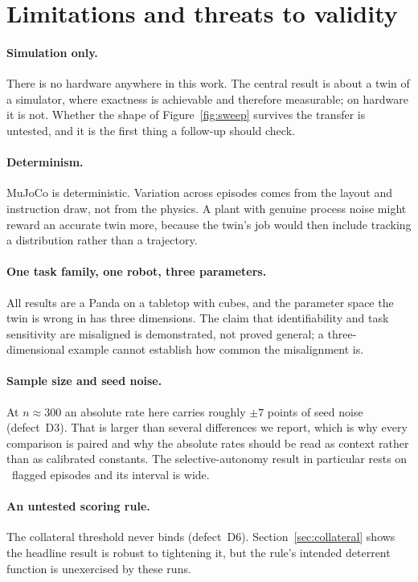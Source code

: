 \documentclass[11pt,a4paper]{article}
\newcommand{\defect}[1]{\textsc{#1}}
\begin{document}
\section{Limitations and threats to validity}
\label{sec:limits}

\paragraph{Simulation only.} There is no hardware anywhere in this work. The
central result is about a twin of a simulator, where exactness is achievable and
therefore measurable; on hardware it is not. Whether the shape of
Figure~\ref{fig:sweep} survives the transfer is untested, and it is the first
thing a follow-up should check.

\paragraph{Determinism.} MuJoCo is deterministic. Variation across episodes comes
from the layout and instruction draw, not from the physics. A plant with genuine
process noise might reward an accurate twin more, because the twin's job would
then include tracking a distribution rather than a trajectory.

\paragraph{One task family, one robot, three parameters.} All results are a Panda
on a tabletop with cubes, and the parameter space the twin is wrong in has three
dimensions. The claim that identifiability and task sensitivity are misaligned is
demonstrated, not proved general; a three-dimensional example cannot establish
how common the misalignment is.

\paragraph{Sample size and seed noise.} At $n\approx300$ an absolute rate here
carries roughly $\pm7$ points of seed noise (defect~\defect{D3}). That is larger
than several differences we report, which is why every comparison is paired and
why the absolute rates should be read as context rather than as calibrated
constants. The selective-autonomy result in particular rests on
\numSelPoolNUn\ flagged episodes and its interval is wide.

\paragraph{An untested scoring rule.} The collateral threshold never binds
(defect~\defect{D6}). Section~\ref{sec:collateral} shows the headline result is
robust to tightening it, but the rule's intended deterrent function is unexercised
by these runs.
\end{document}
